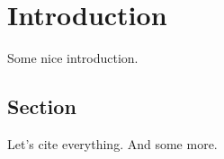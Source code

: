 \chapter{Introduction}\label{ch:introduction}
Some nice introduction.

\section{Section}
Let's cite everything\cite{braemerPairLocalizationDipolar2022,eulerMetronomeSpinStabilizes2024,franzEmergentPairLocalization2022,franzObservationUniversalRelaxation2023,geierTimereversalDipolarQuantum}. And some more\cite{luitzHowSmallQuantum2017,nandkishoreManyBodyLocalized2017}.